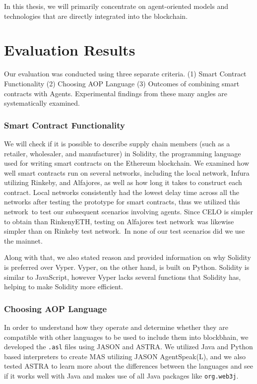 \vspace{.5cm}

In this thesis, we will primarily concentrate on agent-oriented models and technologies that are directly integrated into the blockchain.

\section{Evaluation Results}

Our evaluation was conducted using three separate criteria. (1) Smart Contract Functionality (2) Choosing \ac{AOP} Language (3) Outcomes of combining smart contracts with Agents. Experimental findings from these many angles are systematically examined.

\subsubsection{Smart Contract Functionality}
  
  We will check if it is possible to describe supply chain members (such as a retailer, wholesaler, and manufacturer) in Solidity, the programming language used for writing smart contracts on the Ethereum blockchain. We examined how well smart contracts run on several networks, including the local network, Infura utilizing Rinkeby, and Alfajores, as well as how long it takes to construct each contract. Local networks consistently had the lowest delay time across all the networks after testing the prototype for smart contracts, thus we utilized this network to test our subsequent scenarios involving agents. Since CELO is simpler to obtain than RinkenyETH, testing on Alfajores test network was likewise simpler than on Rinkeby test network. In none of our test scenarios did we use the mainnet.
  
  \vspace{.5cm}
  
  Along with that, we also stated reason and provided information on why Solidity is preferred over Vyper. Vyper, on the other hand, is built on Python. Solidity is similar to JavaScript, however Vyper lacks several functions that Solidity has, helping to make Solidity more efficient.

\subsubsection{Choosing \ac{AOP} Language}

  In order to understand how they operate and determine whether they are compatible with other languages to be used to include them into blockbhain, we developed the \texttt{.asl} files using JASON and \ac{ASTRA}. We utilized Java and Python based interpreters to create \ac{MAS} utilizing JASON AgentSpeak(L), and we also tested \ac{ASTRA} to learn more about the differences between the languages and see if it works well with Java and makes use of all Java packages like \texttt{org.web3j}. 


